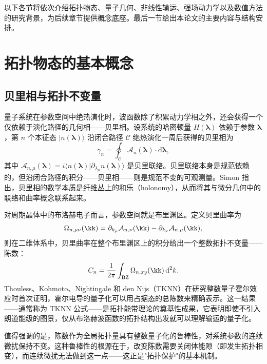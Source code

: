 以下各节将依次介绍拓扑物态、量子几何、非线性输运、强场动力学以及数值方法的研究背景，为后续章节提供概念底座。最后一节给出本论文的主要内容与结构安排。


\section{拓扑物态的基本概念}
\label{sec:topology-basics}

\subsection{贝里相与拓扑不变量}

量子系统在参数空间中绝热演化时，波函数除了积累动力学相之外，还会获得一个仅依赖于演化路径的几何相——贝里相\cite{Berry}。设系统的哈密顿量 $H(\bm{\lambda})$ 依赖于参数 $\bm{\lambda}$，第 $n$ 个本征态 $|n(\bm{\lambda})\rangle$ 沿闭合路径 $\mathcal{C}$ 绝热演化一周后获得的贝里相为
\begin{equation}
  \gamma_n = \oint_{\mathcal{C}} \bm{\mathcal{A}}_n(\bm{\lambda}) \cdot \mathrm{d}\bm{\lambda},
\end{equation}
其中 $\mathcal{A}_{n,\mu}(\bm{\lambda}) = i\langle n(\bm{\lambda}) | \partial_{\lambda_\mu} n(\bm{\lambda}) \rangle$ 是贝里联络。贝里联络本身是规范依赖的，但沿闭合路径的积分——贝里相——则是规范不变的可观测量。Simon 指出，贝里相的数学本质是纤维丛上的和乐（holonomy），从而将其与微分几何中的联络和曲率概念联系起来\cite{berry_phase_1}。

对周期晶体中的布洛赫电子而言，参数空间就是布里渊区。定义贝里曲率为
\begin{equation}
  \Omega_{n,\mu\nu}(\kk) = \partial_{k_\mu} \mathcal{A}_{n,\nu}(\kk) - \partial_{k_\nu} \mathcal{A}_{n,\mu}(\kk),
\end{equation}
则在二维体系中，贝里曲率在整个布里渊区上的积分给出一个整数拓扑不变量——陈数：
\begin{equation}
  C_n = \frac{1}{2\pi} \int_{\mathrm{BZ}} \Omega_{n,xy}(\kk) \, \mathrm{d}^2k.
\end{equation}
Thouless、Kohmoto、Nightingale 和 den Nijs（TKNN）在研究整数量子霍尔效应时首次证明，霍尔电导的量子化可以用占据态的总陈数来精确表示\cite{PhysRevLett.95.016405}。这一结果——通常称为 TKNN 公式——是拓扑能带理论的奠基性成果，它表明即使不引入朗道能级的图景，仅从布洛赫波函数的拓扑结构出发就可以理解输运的量子化。

值得强调的是，陈数作为全局拓扑量具有整数量子化的鲁棒性，对系统参数的连续微扰保持不变。这种鲁棒性的根源在于，改变陈数需要关闭体能隙（即发生拓扑相变），而连续微扰无法做到这一点——这正是"拓扑保护"的基本机制。

